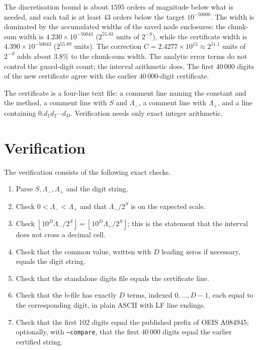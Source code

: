 \documentclass[11pt,a4paper]{article}
\theoremstyle{remark}
\newcommand{\floor}[1]{\left\lfloor #1 \right\rfloor}
\begin{document}
The discretisation bound is about $1595$ orders of magnitude below what
is needed, and each tail is at least $43$ orders below the target
$10^{-50000}$. The width is dominated by the accumulated widths of the
saved node enclosures: the chunk-sum width is
$4.230\times10^{-50043}$ ($2^{55.83}$ units of $2^{-S}$), while the
certificate width is $4.390\times10^{-50043}$ ($2^{55.89}$ units). The
correction $C=2.4277\times10^{15}\approx2^{51.1}$ units of $2^{-S}$ adds
about $3.8\%$ to the chunk-sum width. The analytic error terms do not
control the guard-digit count; the interval arithmetic does. The first
$40\,000$ digits of the new certificate agree with the earlier
$40\,000$-digit certificate.

The certificate is a four-line text file: a comment line naming the
constant and the method, a comment line with $S$ and $\Lambda_-$, a
comment line with $\Lambda_+$, and a line containing
$0.d_1d_2\cdots d_D$. Verification needs only exact integer arithmetic.

\section{Verification}

The verification consists of the following exact checks.

\begin{enumerate}[leftmargin=1.6em]
\item Parse $S,\Lambda_-,\Lambda_+$ and the digit string.
\item Check $0<\Lambda_-<\Lambda_+$ and that $\Lambda_-/2^S$ is on the
  expected scale.
\item Check $\floor{10^D\Lambda_-/2^S}=\floor{10^D\Lambda_+/2^S}$;
  this is the statement that the interval does not cross a decimal cell.
\item Check that the common value, written with $D$ leading zeros if
  necessary, equals the digit string.
\item Check that the standalone digits file equals the certificate line.
\item Check that the b-file has exactly $D$ terms, indexed
  $0,\ldots,D-1$, each equal to the corresponding digit, in plain ASCII
  with LF line endings.
\item Check that the first 102 digits equal the published prefix of OEIS
  A084945; optionally, with \texttt{--compare}, that the first
  $40\,000$ digits equal the earlier certified string.
\end{enumerate}
\end{document}
